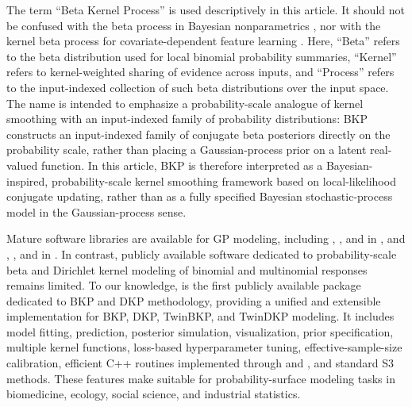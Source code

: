 \documentclass[article, shortnames]{jss}
\begin{document}
The term ``Beta Kernel Process'' is used descriptively in this article. It should not be confused with the beta process in Bayesian nonparametrics \citep{Hjort1990BP}, nor with the kernel beta process for covariate-dependent feature learning \citep{Ren2011KBP}. 
Here, ``Beta'' refers to the beta distribution used for local binomial probability summaries, ``Kernel'' refers to kernel-weighted sharing of evidence across inputs, and ``Process'' refers to the input-indexed collection of such beta distributions over the input space. 
The name is intended to emphasize a probability-scale analogue of kernel smoothing with an input-indexed family of probability distributions: BKP constructs an input-indexed family of conjugate beta posteriors directly on the probability scale, rather than placing a Gaussian-process prior on a latent real-valued function.
In this article, BKP is therefore interpreted as a Bayesian-inspired, probability-scale kernel smoothing framework based on local-likelihood conjugate updating, rather than as a fully specified Bayesian stochastic-process model in the Gaussian-process sense.

Mature software libraries are available for GP modeling, including  \citep{Roustant2012DiceKriging},  \citep{MacDonald2015GPfit}, and  \citep{Piironen2022gplite} in , and  \citep{Gardner2018GPyTorch},  \citep{Matthews2017GPflow}, and  \citep{gpy2014} in . 
In contrast, publicly available software dedicated to probability-scale beta and Dirichlet kernel modeling of binomial and multinomial responses remains limited. 
To our knowledge,  is the first publicly available  package dedicated to BKP and DKP methodology, providing a unified and extensible implementation for BKP, DKP, TwinBKP, and TwinDKP modeling. 
It includes model fitting, prediction, posterior simulation, visualization, prior specification, multiple kernel functions, loss-based hyperparameter tuning, effective-sample-size calibration, efficient C++ routines implemented through  \citep{Eddelbuettel2011Rcpp} and  \citep{Eddelbuettel2014RcppArmadillo}, and standard S3 methods. 
These features make  suitable for probability-surface modeling tasks in biomedicine, ecology, social science, and industrial statistics.
\end{document}
